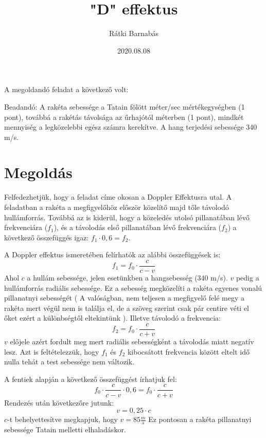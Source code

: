 \documentclass{article}[12pt,a4paper]
\title{"D" effektus}
\author{Rátki Barnabás}
\date{2020.08.08}
\begin{document}
\maketitle

A megoldandó feladat a következő volt: 
\begin{displayquote}
Beadandó: A rakéta sebessége a Tatain fölött méter/sec mértékegységben (1 pont), továbbá a rakétás távolsága az űrhajótól méterben (1 pont), mindkét mennyiség a legközelebbi egész számra kerekítve. A hang terjedési sebessége 340 m/s. 
\end{displayquote}

\section{Megoldás}
Felfedezhetjük, hogy a feladat címe okosan a Doppler Effektusra utal. A feladatban a rakéta a megfigyelőhöz először közelítő majd tőle távolodó hullámforrás. Továbbá az is kiderül, hogy a közeledés utolsó pillanatában lévő frekvenciára ($f_1$), és a távolodás első pillanatában lévő frekvenciára ($f_2$) a következő összefüggés igaz: $f_1 \cdot 0,6 = f_2$.\par
A Doppler effektus ismeretében felírhatók az alábbi összefüggések is: $$f_1 = f_0\cdot\frac{c}{c-v}$$ Ahol $c$ a hullám sebessége, jelen esetünkben a hangsebesség (340 m/s). $v$ pedig a hullámforrás radiális sebessége. Ez a sebesség megközelíti a rakéta egyenes vonalú pillanatnyi sebességét ( A valóságban, nem teljesen a megfigyelő felé megy a rakéta mert végül nem is találja el, de a szöveg szerint csak pár centire véti el őket ezért a különbségtől eltekintünk ). Illetve távolodó a frekvencia: $$f_2 = f_0\cdot\frac{c}{c+v}$$ $v$ előjele azért fordult meg mert radiális sebességként a távolodás miatt negatív lesz. Azt is feltételezzük, hogy $f_1$ és $f_2$ kibocsátott frekvencia között eltelt idő nulla tehát a test sebessége nem változik.\par
A fentiek alapján a következő összefüggést írhatjuk fel: $$f_0\cdot\frac{c}{c-v} \cdot 0,6 = f_0\cdot\frac{c}{c+v}$$ Rendezés után következőre jutunk: $$v = 0,25\cdot c$$ $c$-t behelyettesítve megkapjuk, hogy $v = 85 \frac{m}{s}$ Ez pontosan a rakéta pillanatnyi sebessége Tatain melletti elhaladáskor.
\end{document}
